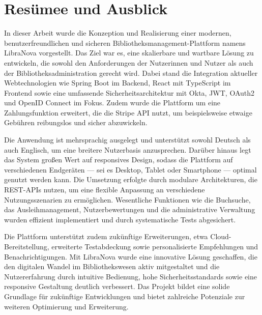 \chapter{Resümee und Ausblick}

In dieser Arbeit wurde die Konzeption und Realisierung einer modernen, benutzerfreundlichen und sicheren Bibliotheksmanagement-Plattform namens LibraNova vorgestellt. Das Ziel war es, eine skalierbare und wartbare Lösung zu entwickeln, die sowohl den Anforderungen der Nutzerinnen und Nutzer als auch der Bibliotheksadministration gerecht wird. Dabei stand die Integration aktueller Webtechnologien wie Spring Boot im Backend, React mit TypeScript im Frontend sowie eine umfassende Sicherheitsarchitektur mit Okta, JWT, OAuth2 und OpenID Connect im Fokus. Zudem wurde die Plattform um eine Zahlungsfunktion erweitert, die die Stripe API nutzt, um beispielsweise etwaige Gebühren reibungslos und sicher abzuwickeln.

\noindent Die Anwendung ist mehrsprachig ausgelegt und unterstützt sowohl Deutsch als auch Englisch, um eine breitere Nutzerbasis anzusprechen. Darüber hinaus legt das System großen Wert auf responsives Design, sodass die Plattform auf verschiedenen Endgeräten — sei es Desktop, Tablet oder Smartphone — optimal genutzt werden kann. Die Umsetzung erfolgte durch modulare Architekturen, die REST-APIs nutzen, um eine flexible Anpassung an verschiedene Nutzungsszenarien zu ermöglichen. Wesentliche Funktionen wie die Buchsuche, das Ausleihmanagement, Nutzerbewertungen und die administrative Verwaltung wurden effizient implementiert und durch systematische Tests abgesichert.

\noindent Die Plattform unterstützt zudem zukünftige Erweiterungen, etwa Cloud-Bereitstellung, erweiterte Testabdeckung sowie personalisierte Empfehlungen und Benachrichtigungen. Mit LibraNova wurde eine innovative Lösung geschaffen, die den digitalen Wandel im Bibliothekswesen aktiv mitgestaltet und die Nutzererfahrung durch intuitive Bedienung, hohe Sicherheitsstandards sowie eine responsive Gestaltung deutlich verbessert. Das Projekt bildet eine solide Grundlage für zukünftige Entwicklungen und bietet zahlreiche Potenziale zur weiteren Optimierung und Erweiterung.